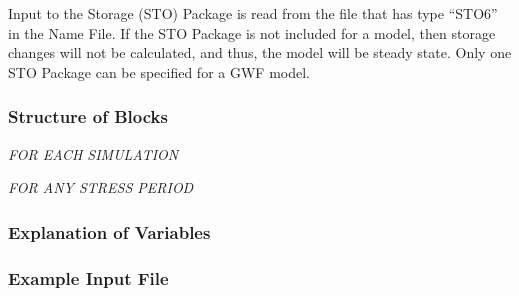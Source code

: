 Input to the Storage (STO) Package is read from the file that has type ``STO6'' in the Name File.  If the STO Package is not included for a model, then storage changes will not be calculated, and thus, the model will be steady state.  Only one STO Package can be specified for a GWF model.

\vspace{5mm}
\subsubsection{Structure of Blocks}

\vspace{5mm}
\noindent \textit{FOR EACH SIMULATION}


\vspace{5mm}
\noindent \textit{FOR ANY STRESS PERIOD}


\vspace{5mm}
\subsubsection{Explanation of Variables}
\begin{description}

\end{description}

\vspace{5mm}
\subsubsection{Example Input File}


